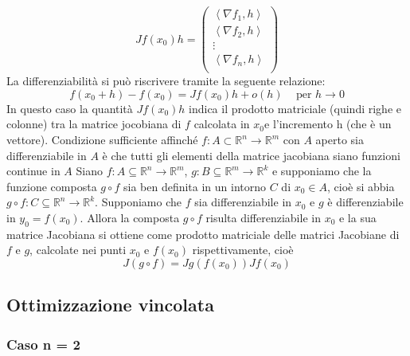 \documentclass[a4paper]{article}
\numberwithin{equation}{subsection}
\begin{document}
\[Jf(x_0)h = \begin{pmatrix}
    \left< \nabla f_1, h\right>\\
    \left< \nabla f_2, h\right>\\
   \vdots\\
   \left< \nabla f_n, h\right>\\
    
\end{pmatrix}\]
La differenziabilità si può riscrivere tramite la seguente relazione:
\[f(x_0 + h) - f(x_0) = Jf(x_0)h + o(h) \; \; \; \text{ per } h \rightarrow 0\]
In questo caso la quantità $Jf(x_0)h$ indica il prodotto matriciale (quindi righe e colonne) tra la matrice jocobiana
di $f$ calcolata in $x_0 $e l'incremento h (che è un vettore).
\thm{}
{
    Condizione sufficiente affinché $f : A \subset \mathbb{R}^n \rightarrow \mathbb{R}^m$ con $A$ aperto sia differenziabile in 
    $A$ è che tutti gli elementi della matrice jacobiana siano funzioni continue in $A$
}
\thm{}
{
    Siano $f : A \subseteq \mathbb{R}^n \rightarrow \mathbb{R}^m$, $g : B \subseteq \mathbb{R}^m \rightarrow \mathbb{R}^k$ e 
    supponiamo che la funzione composta $g \circ f$ sia ben definita in un intorno $C$ di $x_0 \in A$, cioè si 
    abbia $g \circ f : C \subseteq \mathbb{R}^n \rightarrow \mathbb{R}^k$. Supponiamo che $f$ sia differenziabile
    in $x_0$ e $g$ è differenziabile in $y_0 = f(x_0)$. Allora la composta $g \circ f$ risulta differenziabile in $x_0$ 
    e la sua matrice Jacobiana si ottiene come prodotto matriciale delle matrici Jacobiane di $f$ e $g$, calcolate 
    nei punti $x_0$ e $f(x_0)$ rispettivamente, cioè
    \[J(g \circ f) = Jg(f(x_0))Jf(x_0)\]
}

\subsection{Ottimizzazione vincolata}

\subsubsection{Caso n = 2}
\end{document}
